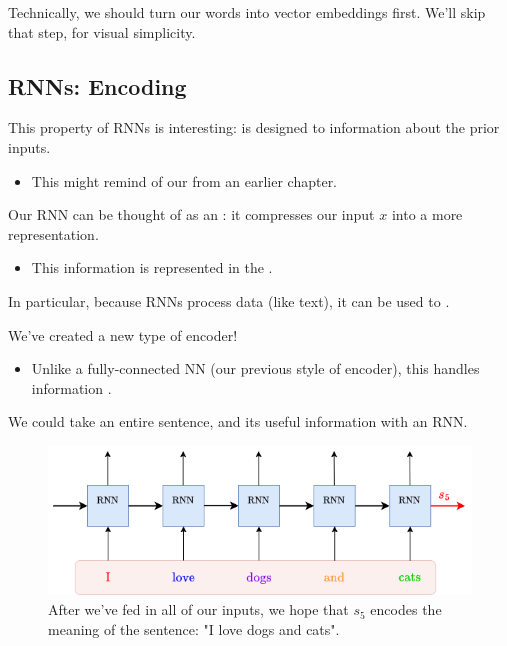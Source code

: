         Technically, we should turn our words into vector embeddings first. We'll skip that step, for visual simplicity.



    \phantom{}

    \subsection{RNNs: Encoding}

        This property of RNNs is interesting:  is designed to  information about the prior inputs.

        \begin{itemize}
            \item This might remind of our  from an earlier chapter.\\
        \end{itemize}

        \begin{concept}
            Our RNN can be thought of as an : it compresses our input $x$ into a more  representation.

            \begin{itemize}
                \item This information is represented in the .
            \end{itemize}

            In particular, because RNNs process  data (like text), it can be used to .
        \end{concept}

        We've created a new type of encoder! 

        \begin{itemize}
            \item Unlike a fully-connected NN (our previous style of encoder), this handles information .
        \end{itemize}

        We could take an entire sentence, and  its useful information with an RNN.

        \begin{figure}[H]
            \centering
            \includegraphics[width=0.7\linewidth]{images/transformers_images/rnn_encoder.png}
            \caption*{After we've fed in all of our inputs, we hope that $s_5$ encodes the meaning of the sentence: "I love dogs and cats".}
        \end{figure}

